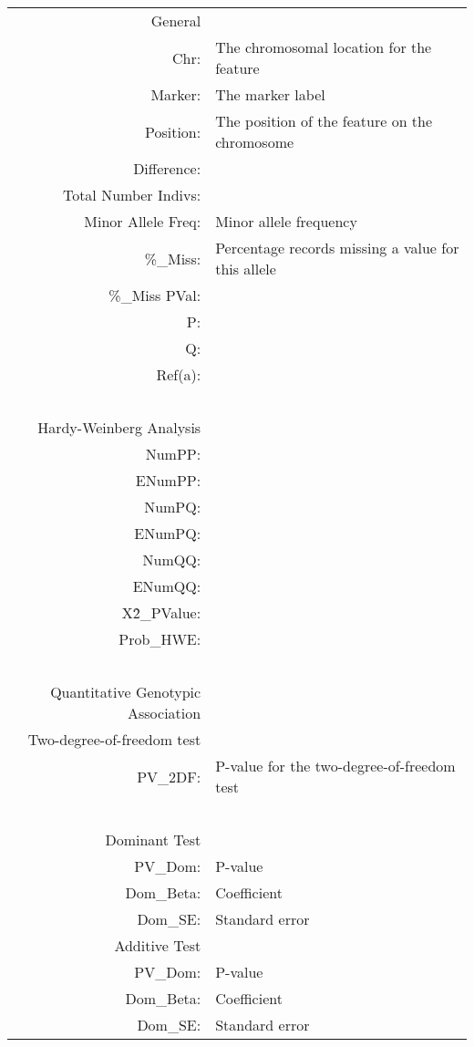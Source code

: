 \vspace{1em}
\begin{supertabular}{r p{5in}}
  General & ~ \\
    Chr: & The chromosomal location for the feature \\
    Marker: & The marker label \\
    Position: & The position of the feature on the chromosome \\
    Difference: & \\
    Total Number Indivs: & \\
    Minor Allele Freq: & Minor allele frequency\\
    \%{}\_Miss: & Percentage records missing a value for this allele\\
    \%{}\_Miss PVal: & \\
    P: & \\
    Q: & \\
    Ref(a): & \\
    ~ & ~\\[1em]
  Hardy-Weinberg Analysis & ~ \\
    NumPP: &    \\
    ENumPP: &    \\
    NumPQ: &    \\
    ENumPQ: &    \\
    NumQQ: &    \\
    ENumQQ: &    \\
    X\^2\_PValue: &    \\
    Prob\_HWE: &     \\
    ~ & ~ \\

  Quantitative Genotypic Association & \\
          Two-degree-of-freedom test & \\
   PV\_2DF: & P-value for the two-degree-of-freedom test \\

   ~ & ~ \\[1em]
  Dominant Test & ~ \\
      PV\_Dom: & P-value \\
      Dom\_Beta: & Coefficient \\
      Dom\_SE: & Standard error \\[1em]

   Additive Test & ~ \\
      PV\_Dom: & P-value \\
      Dom\_Beta: & Coefficient \\
      Dom\_SE: & Standard error \\[1em]


\end{supertabular}
